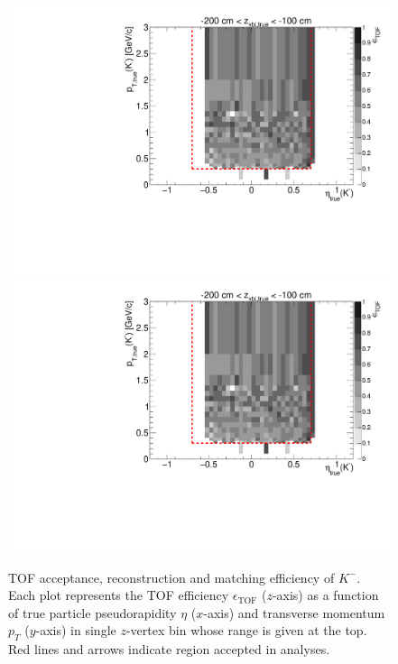 \begin{figure}[hb]
\caption[TOF acceptance, reconstruction and matching efficiency of $K^{-}$.]{TOF acceptance, reconstruction and matching efficiency of $K^{-}$. Each plot represents the TOF efficiency $\epsilon_{\text{TOF}}$ ($z$-axis) as a function of true particle pseudorapidity $\eta$ ($x$-axis) and transverse momentum $p_{T}$ ($y$-axis) in single $z$-vertex bin whose range is given at the top. Red lines and arrows indicate region accepted in analyses.}\label{fig:eff_kaon_minus}
\centering
\parbox{0.495\textwidth}{
  \centering
  \includegraphics[width=\linewidth,page=3]{graphics/eff/Eff2D_TOF_kaon_Minus.pdf}\\
  \includegraphics[width=\linewidth,page=5]{graphics/eff/Eff2D_TOF_kaon_Minus.pdf}\\
}
\end{figure}
